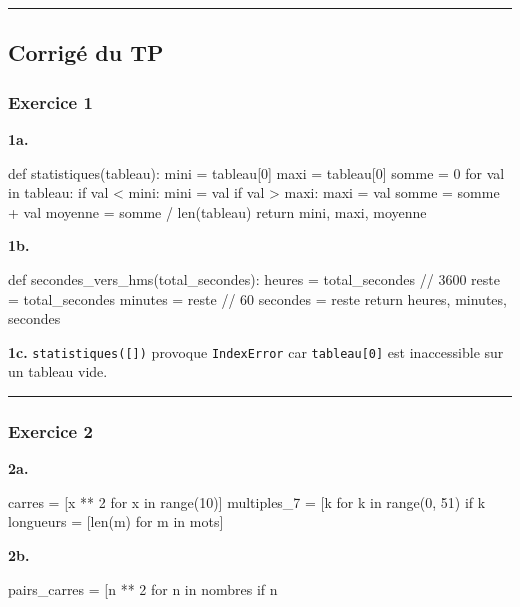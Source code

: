 \begin{center}\rule{0.5\linewidth}{0.5pt}\end{center}

\subsection{Corrigé du TP}

\subsubsection{Exercice 1}

\textbf{1a.}

\begin{python}
def statistiques(tableau):
    mini = tableau[0]
    maxi = tableau[0]
    somme = 0
    for val in tableau:
        if val < mini:
            mini = val
        if val > maxi:
            maxi = val
        somme = somme + val
    moyenne = somme / len(tableau)
    return mini, maxi, moyenne
\end{python}

\textbf{1b.}

\begin{python}
def secondes_vers_hms(total_secondes):
    heures = total_secondes // 3600
    reste = total_secondes %
    minutes = reste // 60
    secondes = reste %
    return heures, minutes, secondes
\end{python}

\textbf{1c.} \texttt{statistiques({[}{]})} provoque \texttt{IndexError}
car \texttt{tableau{[}0{]}} est inaccessible sur un tableau vide.

\begin{center}\rule{0.5\linewidth}{0.5pt}\end{center}

\subsubsection{Exercice 2}

\textbf{2a.}

\begin{python}
carres = [x ** 2 for x in range(10)]
multiples_7 = [k for k in range(0, 51) if k %
longueurs = [len(m) for m in mots]
\end{python}

\textbf{2b.}

\begin{python}
pairs_carres = [n ** 2 for n in nombres if n %
\end{python}

